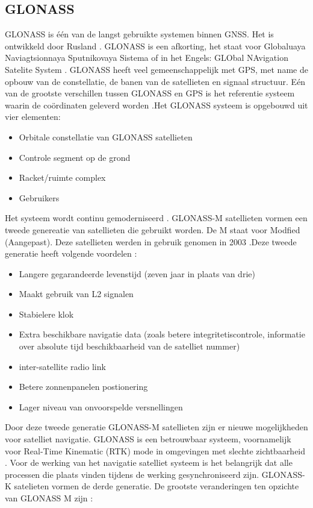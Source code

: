 \subsection{GLONASS}
\label{LGLO}
GLONASS is \'e\'en van de langst gebruikte systemen binnen GNSS. Het is ontwikkeld door Rusland \cite{LBibGLONASS2}. GLONASS is een afkorting, het staat voor Globaluaya Naviagtsionnaya Sputnikovaya Sistema of in het Engels: GLObal NAvigation Satelite System  \cite{LBibBeiDou,LBibGNSS8}. GLONASS heeft veel gemeenschappelijk met GPS, met name de opbouw van de constellatie, de banen van de satellieten en signaal structuur. E\'en van de grootste verschillen tussen GLONASS en GPS is het referentie systeem waarin de co\"ordinaten geleverd worden \cite{LBibGNSS8}.Het GLONASS systeem is opgebouwd uit vier elementen:
\begin{itemize}
	\item Orbitale constellatie van GLONASS satellieten
	\item Controle segment op de grond
	\item Racket/ruimte complex
	\item Gebruikers
\end{itemize} \cite{LBibGLONASS2} Het systeem wordt continu gemoderniseerd \cite{LBibGNSS4}. GLONASS-M satellieten vormen een tweede genereatie van satellieten die gebruikt worden\cite{LBibGNSS}. De M staat voor Modfied (Aangepast). Deze satellieten werden in gebruik genomen in 2003 \cite{LBibPPP}.Deze tweede generatie heeft volgende voordelen \cite{LBibGLONASS,LBibPPP}:
\begin{itemize}
	\item Langere gegarandeerde levenstijd (zeven jaar in plaats van drie)
	\item Maakt gebruik van L2 signalen
	\item Stabielere klok
	\item Extra beschikbare navigatie data (zoals betere integritetiscontrole, informatie over absolute tijd beschikbaarheid van de satelliet nummer)
	\item inter-satellite radio link
	\item Betere zonnenpanelen postionering
	\item Lager niveau van onvoorspelde versnellingen
\end{itemize}
Door deze tweede generatie GLONASS-M satellieten zijn er nieuwe mogelijkheden voor satelliet navigatie. GLONASS is een betrouwbaar systeem, voornamelijk voor Real-Time Kinematic (RTK) mode in omgevingen met slechte zichtbaarheid \cite{LBibGLONASS}. Voor de werking van het navigatie satelliet systeem is het belangrijk dat alle processen die plaats vinden tijdens de werking gesynchroniseerd zijn. GLONASS-K satelieten vormen de derde generatie. De grootste veranderingen ten opzichte van GLONASS M zijn \cite{LBibGLONASS2}:
